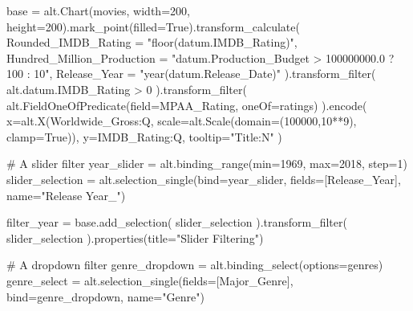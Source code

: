 \documentclass[
  letterpaper,
  DIV=11,
  numbers=noendperiod]{scrartcl}
\newenvironment{Shaded}{\begin{snugshade}}{\end{snugshade}}
\newcommand{\BuiltInTok}[1]{\textcolor[rgb]{0.00,0.23,0.31}{#1}}
\newcommand{\CommentTok}[1]{\textcolor[rgb]{0.37,0.37,0.37}{#1}}
\newcommand{\DecValTok}[1]{\textcolor[rgb]{0.68,0.00,0.00}{#1}}
\newcommand{\NormalTok}[1]{\textcolor[rgb]{0.00,0.23,0.31}{#1}}
\newcommand{\OperatorTok}[1]{\textcolor[rgb]{0.37,0.37,0.37}{#1}}
\newcommand{\StringTok}[1]{\textcolor[rgb]{0.13,0.47,0.30}{#1}}
\newcommand{\VariableTok}[1]{\textcolor[rgb]{0.07,0.07,0.07}{#1}}
\begin{document}
\begin{Shaded}
\begin{Highlighting}[]
\NormalTok{base }\OperatorTok{=}\NormalTok{ alt.Chart(movies, width}\OperatorTok{=}\DecValTok{200}\NormalTok{, height}\OperatorTok{=}\DecValTok{200}\NormalTok{).mark\_point(filled}\OperatorTok{=}\VariableTok{True}\NormalTok{).transform\_calculate(}
\NormalTok{    Rounded\_IMDB\_Rating }\OperatorTok{=} \StringTok{"floor(datum.IMDB\_Rating)"}\NormalTok{,}
\NormalTok{    Hundred\_Million\_Production }\OperatorTok{=}  \StringTok{"datum.Production\_Budget \textgreater{} 100000000.0 ? 100 : 10"}\NormalTok{,}
\NormalTok{    Release\_Year }\OperatorTok{=} \StringTok{"year(datum.Release\_Date)"}
\NormalTok{).transform\_filter(}
\NormalTok{    alt.datum.IMDB\_Rating }\OperatorTok{\textgreater{}} \DecValTok{0}
\NormalTok{).transform\_filter(}
\NormalTok{    alt.FieldOneOfPredicate(field}\OperatorTok{=}\StringTok{\textquotesingle{}MPAA\_Rating\textquotesingle{}}\NormalTok{, oneOf}\OperatorTok{=}\NormalTok{ratings)}
\NormalTok{).encode(}
\NormalTok{    x}\OperatorTok{=}\NormalTok{alt.X(}\StringTok{\textquotesingle{}Worldwide\_Gross:Q\textquotesingle{}}\NormalTok{, scale}\OperatorTok{=}\NormalTok{alt.Scale(domain}\OperatorTok{=}\NormalTok{(}\DecValTok{100000}\NormalTok{,}\DecValTok{10}\OperatorTok{**}\DecValTok{9}\NormalTok{), clamp}\OperatorTok{=}\VariableTok{True}\NormalTok{)),}
\NormalTok{    y}\OperatorTok{=}\StringTok{\textquotesingle{}IMDB\_Rating:Q\textquotesingle{}}\NormalTok{,}
\NormalTok{    tooltip}\OperatorTok{=}\StringTok{"Title:N"}
\NormalTok{)}

\CommentTok{\# A slider filter}
\NormalTok{year\_slider }\OperatorTok{=}\NormalTok{ alt.binding\_range(}\BuiltInTok{min}\OperatorTok{=}\DecValTok{1969}\NormalTok{, }\BuiltInTok{max}\OperatorTok{=}\DecValTok{2018}\NormalTok{, step}\OperatorTok{=}\DecValTok{1}\NormalTok{)}
\NormalTok{slider\_selection }\OperatorTok{=}\NormalTok{ alt.selection\_single(bind}\OperatorTok{=}\NormalTok{year\_slider, fields}\OperatorTok{=}\NormalTok{[}\StringTok{\textquotesingle{}Release\_Year\textquotesingle{}}\NormalTok{], name}\OperatorTok{=}\StringTok{"Release Year\_"}\NormalTok{)}


\NormalTok{filter\_year }\OperatorTok{=}\NormalTok{ base.add\_selection(}
\NormalTok{    slider\_selection}
\NormalTok{).transform\_filter(}
\NormalTok{    slider\_selection}
\NormalTok{).properties(title}\OperatorTok{=}\StringTok{"Slider Filtering"}\NormalTok{)}

\CommentTok{\# A dropdown filter}
\NormalTok{genre\_dropdown }\OperatorTok{=}\NormalTok{ alt.binding\_select(options}\OperatorTok{=}\NormalTok{genres)}
\NormalTok{genre\_select }\OperatorTok{=}\NormalTok{ alt.selection\_single(fields}\OperatorTok{=}\NormalTok{[}\StringTok{\textquotesingle{}Major\_Genre\textquotesingle{}}\NormalTok{], bind}\OperatorTok{=}\NormalTok{genre\_dropdown, name}\OperatorTok{=}\StringTok{"Genre"}\NormalTok{)}


\end{Highlighting}
\end{Shaded}
\end{document}
